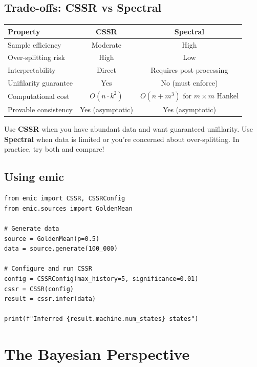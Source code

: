 \documentclass[11pt,a4paper]{article}
\theoremstyle{definition}
\theoremstyle{plain}
\begin{document}
\subsection{Trade-offs: CSSR vs Spectral}

\begin{center}
\begin{tabular}{lcc}
\toprule
\textbf{Property} & \textbf{CSSR} & \textbf{Spectral} \\
\midrule
Sample efficiency & Moderate & High \\
Over-splitting risk & High & Low \\
Interpretability & Direct & Requires post-processing \\
Unifilarity guarantee & Yes & No (must enforce) \\
Computational cost & $O(n \cdot k^2)$ & $O(n + m^3)$ for $m \times m$ Hankel \\
Provable consistency & Yes (asymptotic) & Yes (asymptotic) \\
\bottomrule
\end{tabular}
\end{center}

\begin{intuition}
Use \textbf{CSSR} when you have abundant data and want guaranteed unifilarity. Use \textbf{Spectral} when data is limited or you're concerned about over-splitting. In practice, try both and compare!
\end{intuition}

\subsection{Using emic}

\begin{lstlisting}
from emic import CSSR, CSSRConfig
from emic.sources import GoldenMean

# Generate data
source = GoldenMean(p=0.5)
data = source.generate(100_000)

# Configure and run CSSR
config = CSSRConfig(max_history=5, significance=0.01)
cssr = CSSR(config)
result = cssr.infer(data)

print(f"Inferred {result.machine.num_states} states")
\end{lstlisting}

\section{The Bayesian Perspective}
\label{sec:bayesian}
\end{document}

